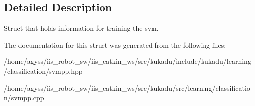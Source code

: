 \subsection{Detailed Description}
Struct that holds information for training the svm. 

The documentation for this struct was generated from the following files\+:\begin{DoxyCompactItemize}
\item 
/home/agyss/iis\+\_\+robot\+\_\+sw/iis\+\_\+catkin\+\_\+ws/src/kukadu/include/kukadu/learning/classification/svmpp.\+hpp\item 
/home/agyss/iis\+\_\+robot\+\_\+sw/iis\+\_\+catkin\+\_\+ws/src/kukadu/src/learning/classification/svmpp.\+cpp\end{DoxyCompactItemize}
